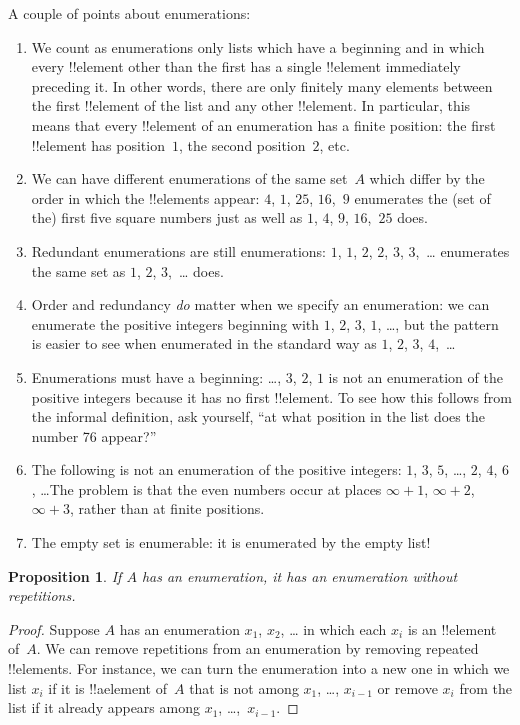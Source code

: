 \documentclass[10pt,a4paper]{article}
\theoremstyle{plain}
\newtheorem{prop}[thm]{Proposition}
\theoremstyle{definition}
\theoremstyle{remark}
\newenvironment{explain}{}{}
\begin{document}
\begin{explain}
A couple of points about enumerations:
\begin{enumerate}
\item We count as enumerations only lists which have a beginning and
  in which every !!{element} other than the first has a single
  !!{element} immediately preceding it.  In other words, there are
  only finitely many elements between the first !!{element} of the
  list and any other !!{element}. In particular, this means that every
  !!{element} of an enumeration has a finite position: the first
  !!{element} has position~$1$, the second position~$2$, etc.
\item We can have different enumerations of the same set~$A$ which
  differ by the order in which the !!{element}s appear: $4$, $1$,
  $25$, $16$,~$9$ enumerates the (set of the) first five square
  numbers just as well as $1$, $4$, $9$, $16$,~$25$ does.
\item Redundant enumerations are still enumerations: $1$, $1$, $2$,
  $2$, $3$, $3$,~\dots{} enumerates the same set as $1$, $2$,
  $3$,~\dots{} does.
\item Order and redundancy \emph{do} matter when we specify an
  enumeration: we can enumerate the positive integers beginning with
  $1$, $2$, $3$, $1$, \dots{}, but the pattern is easier to see when
  enumerated in the standard way as $1$, $2$, $3$, $4$,~\dots
\item Enumerations must have a beginning: \dots, $3$, $2$, $1$ is not
  an enumeration of the positive integers because it has no first
  !!{element}. To see how this follows from the informal definition,
  ask yourself, ``at what position in the list does the number 76
  appear?''
\item The following is not an enumeration of the positive integers:
  $1$, $3$, $5$, \dots, $2$, $4$, $6$, \dots\@ The problem is that the
  even numbers occur at places $\infty + 1$, $\infty + 2$, $\infty +
  3$, rather than at finite positions.
\item The empty set is enumerable: it is enumerated by the empty list!{}
\end{enumerate}
\end{explain}

\begin{prop}
  If $A$ has an enumeration, it has an enumeration without
  repetitions.
\end{prop}

\begin{proof}
  Suppose $A$ has an enumeration $x_1$, $x_2$, \dots{} in which each
  $x_i$ is an !!{element} of~$A$.  We can remove repetitions from an
  enumeration by removing repeated !!{element}s. For instance, we can
  turn the enumeration into a new one in which we list $x_i$ if
  it is !!a{element} of~$A$ that is not among $x_1$, \dots,
  $x_{i-1}$ or remove $x_i$ from the list if it already appears among
  $x_1$, \dots,~$x_{i-1}$.
\end{proof}
\end{document}
